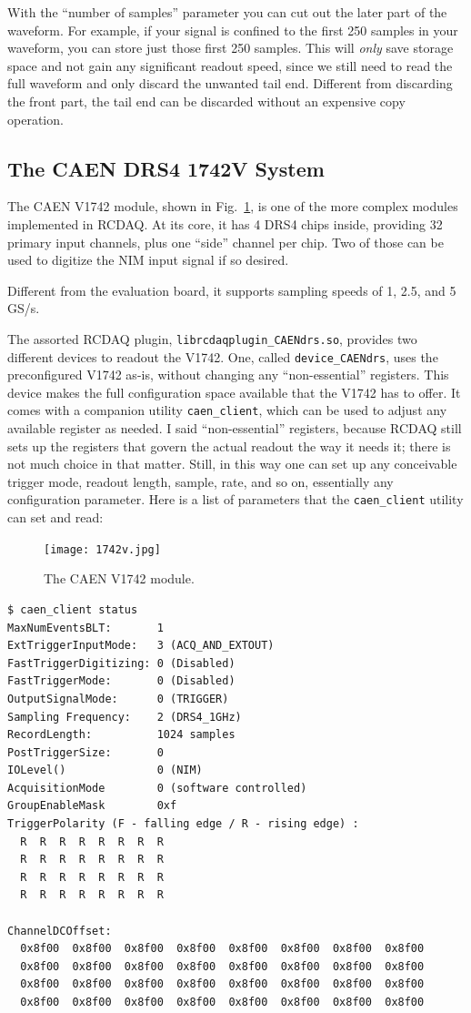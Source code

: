 \documentclass{article}[11pt]
\begin{document}
With the ``number of samples'' parameter you can cut out the later
part of the waveform. For example, if your signal is confined to the
first 250 samples in your waveform, you can store just those first 250
samples. This will \emph{only} save storage space and not gain any
significant readout speed, since we still need to read the full
waveform and only discard the unwanted tail end. Different from
discarding the front part, the tail end can be discarded without an
expensive copy operation.


\subsection{The CAEN DRS4 1742V System}


The CAEN V1742 module, shown in Fig.~\ref{caen1742v}, is one of the
more complex modules implemented in RCDAQ. At its core, it has 4 DRS4
chips inside, providing 32 primary input channels, plus one ``side''
channel per chip. Two of those can be used to digitize the NIM input
signal if so desired.

Different from the evaluation board, it supports sampling speeds of 1,
2.5, and 5\,GS/s.


The assorted RCDAQ plugin, \verb|librcdaqplugin_CAENdrs.so|, provides
two different devices to readout the V1742. One, called
\verb|device_CAENdrs|, uses the preconfigured V1742 as-is, without
changing any ``non-essential'' registers. This device makes the full
configuration space available that the V1742 has to offer. It comes with a
companion utility \verb|caen_client|, which can be used to adjust any
available register as needed. I said ``non-essential'' registers,
because RCDAQ still sets up the registers that govern the actual
readout the way it needs it; there is not much choice in that
matter. Still, in this way one can set up any conceivable trigger
mode, readout length, sample, rate, and so on, essentially any
configuration parameter. Here is a list of parameters that the \verb|caen_client|
utility can set and read:

\begin{figure}
  \centering
  \texttt{[image: 1742v.jpg]}
  \caption{\label{caen1742v}The CAEN V1742 module.}
\end{figure}


\begin{verbatim}
$ caen_client status
MaxNumEventsBLT:       1
ExtTriggerInputMode:   3 (ACQ_AND_EXTOUT)
FastTriggerDigitizing: 0 (Disabled)
FastTriggerMode:       0 (Disabled)
OutputSignalMode:      0 (TRIGGER)
Sampling Frequency:    2 (DRS4_1GHz)
RecordLength:          1024 samples
PostTriggerSize:       0
IOLevel()              0 (NIM)
AcquisitionMode        0 (software controlled)
GroupEnableMask        0xf
TriggerPolarity (F - falling edge / R - rising edge) :
  R  R  R  R  R  R  R  R
  R  R  R  R  R  R  R  R
  R  R  R  R  R  R  R  R
  R  R  R  R  R  R  R  R

ChannelDCOffset:
  0x8f00  0x8f00  0x8f00  0x8f00  0x8f00  0x8f00  0x8f00  0x8f00
  0x8f00  0x8f00  0x8f00  0x8f00  0x8f00  0x8f00  0x8f00  0x8f00
  0x8f00  0x8f00  0x8f00  0x8f00  0x8f00  0x8f00  0x8f00  0x8f00
  0x8f00  0x8f00  0x8f00  0x8f00  0x8f00  0x8f00  0x8f00  0x8f00
\end{verbatim}
\end{document}
